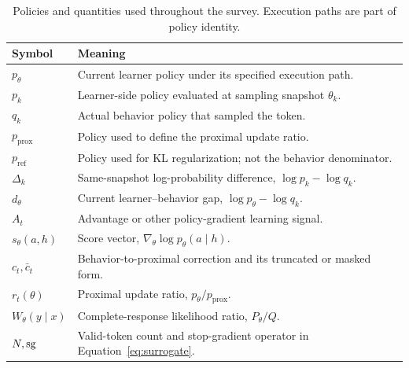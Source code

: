 \begin{table}[!htbp]
\centering\small
\caption{Policies and quantities used throughout the survey. Execution paths are part of policy identity.}\label{tab:notation}
\begin{tabularx}{\linewidth}{@{}lY@{}}\toprule
{} \textbf{Symbol} & \textbf{Meaning}\\\midrule
$p_\theta$ & Current learner policy under its specified execution path.\\
$p_k$ & Learner-side policy evaluated at sampling snapshot $\theta_k$.\\
$q_k$ & Actual behavior policy that sampled the token.\\
$p_{\mathrm{prox}}$ & Policy used to define the proximal update ratio.\\
$p_{\mathrm{ref}}$ & Policy used for KL regularization; not the behavior denominator.\\
$\Delta_k$ & Same-snapshot log-probability difference, $\log p_k-\log q_k$.\\
$d_\theta$ & Current learner--behavior gap, $\log p_\theta-\log q_k$.\\
$A_t$ & Advantage or other policy-gradient learning signal.\\
$s_\theta(a,h)$ & Score vector, $\nabla_\theta\log p_\theta(a\mid h)$.\\
$c_t,\bar c_t$ & Behavior-to-proximal correction and its truncated or masked form.\\
$r_t(\theta)$ & Proximal update ratio, $p_\theta/p_{\mathrm{prox}}$.\\
$W_\theta(y\mid x)$ & Complete-response likelihood ratio, $P_\theta/Q$.\\
$N,\operatorname{sg}$ & Valid-token count and stop-gradient operator in Equation~\eqref{eq:surrogate}.\\\bottomrule
\end{tabularx}
\end{table}


